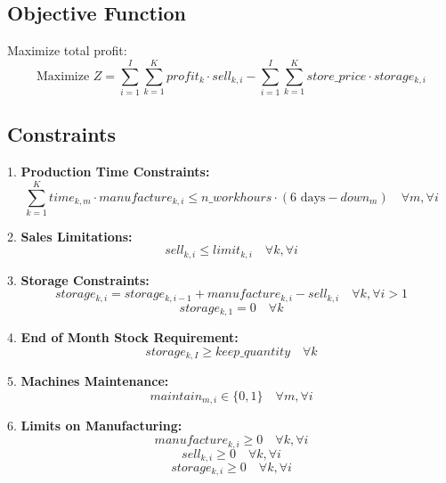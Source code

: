 \documentclass{article}
\begin{document}
\subsection*{Objective Function}
Maximize total profit:
\[
\text{Maximize } Z = \sum_{i=1}^{I} \sum_{k=1}^{K} profit_{k} \cdot sell_{k, i} - \sum_{i=1}^{I} \sum_{k=1}^{K} store\_price \cdot storage_{k, i}
\]

\subsection*{Constraints}

1. \textbf{Production Time Constraints:}
\[
\sum_{k=1}^{K} time_{k, m} \cdot manufacture_{k, i} \leq n\_workhours \cdot (6 \text{ days} - down_{m}) \quad \forall m, \forall i
\]

2. \textbf{Sales Limitations:}
\[
sell_{k, i} \leq limit_{k, i} \quad \forall k, \forall i
\]

3. \textbf{Storage Constraints:}
\[
storage_{k, i} = storage_{k, i-1} + manufacture_{k, i} - sell_{k, i} \quad \forall k, \forall i > 1
\]
\[
storage_{k, 1} = 0 \quad \forall k
\]

4. \textbf{End of Month Stock Requirement:}
\[
storage_{k, I} \geq keep\_quantity \quad \forall k
\]

5. \textbf{Machines Maintenance:}
\[
maintain_{m, i} \in \{0, 1\} \quad \forall m, \forall i
\]

6. \textbf{Limits on Manufacturing:}
\[
manufacture_{k, i} \geq 0 \quad \forall k, \forall i
\]
\[
sell_{k, i} \geq 0 \quad \forall k, \forall i
\]
\[
storage_{k, i} \geq 0 \quad \forall k, \forall i
\]
\end{document}
